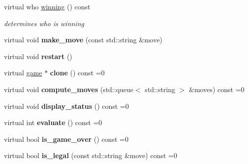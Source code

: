 \begin{DoxyCompactItemize}
\item 
virtual who \hyperlink{classmain__savitch__14_1_1game_a081611c42aa66b4d91bbefeec47c7c4e}{winning} () const 
\begin{DoxyCompactList}\small\item\em determines who is winning \end{DoxyCompactList}\item 
virtual void {\bfseries make\+\_\+move} (const std\+::string \&move)\hypertarget{classmain__savitch__14_1_1game_a20597d0caa907aea47b27fed8be3759b}{}\label{classmain__savitch__14_1_1game_a20597d0caa907aea47b27fed8be3759b}

\item 
virtual void {\bfseries restart} ()\hypertarget{classmain__savitch__14_1_1game_ad521a7d78e7c163a0bc28b709f0d45fd}{}\label{classmain__savitch__14_1_1game_ad521a7d78e7c163a0bc28b709f0d45fd}

\item 
virtual \hyperlink{classmain__savitch__14_1_1game}{game} $\ast$ {\bfseries clone} () const =0\hypertarget{classmain__savitch__14_1_1game_a7b663057f59210dd52738facfc40d959}{}\label{classmain__savitch__14_1_1game_a7b663057f59210dd52738facfc40d959}

\item 
virtual void {\bfseries compute\+\_\+moves} (std\+::queue$<$ std\+::string $>$ \&moves) const =0\hypertarget{classmain__savitch__14_1_1game_a2c0c049f5861026d0f639b5837889b7a}{}\label{classmain__savitch__14_1_1game_a2c0c049f5861026d0f639b5837889b7a}

\item 
virtual void {\bfseries display\+\_\+status} () const =0\hypertarget{classmain__savitch__14_1_1game_ac8205178922c49bab2865187e834b726}{}\label{classmain__savitch__14_1_1game_ac8205178922c49bab2865187e834b726}

\item 
virtual int {\bfseries evaluate} () const =0\hypertarget{classmain__savitch__14_1_1game_a9b9c8c5e9aa57c9a430f20b87cb047aa}{}\label{classmain__savitch__14_1_1game_a9b9c8c5e9aa57c9a430f20b87cb047aa}

\item 
virtual bool {\bfseries is\+\_\+game\+\_\+over} () const =0\hypertarget{classmain__savitch__14_1_1game_a49eed20648918b03fd3e2cf78987b3d1}{}\label{classmain__savitch__14_1_1game_a49eed20648918b03fd3e2cf78987b3d1}

\item 
virtual bool {\bfseries is\+\_\+legal} (const std\+::string \&move) const =0\hypertarget{classmain__savitch__14_1_1game_ad38351422ca1ee3ae58440c1c6b36b30}{}\label{classmain__savitch__14_1_1game_ad38351422ca1ee3ae58440c1c6b36b30}

\end{DoxyCompactItemize}
